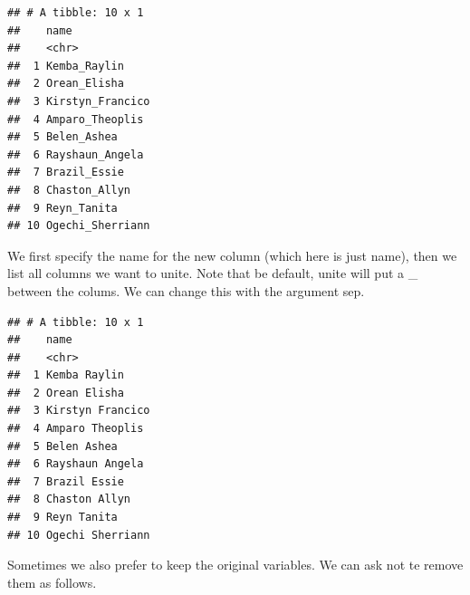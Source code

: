 \documentclass[]{tufte-book}
\newenvironment{Shaded}{}{}
\newcommand{\DataTypeTok}[1]{\textcolor[rgb]{0.56,0.13,0.00}{#1}}
\newcommand{\KeywordTok}[1]{\textcolor[rgb]{0.00,0.44,0.13}{\textbf{#1}}}
\newcommand{\NormalTok}[1]{#1}
\newcommand{\OperatorTok}[1]{\textcolor[rgb]{0.40,0.40,0.40}{#1}}
\newcommand{\StringTok}[1]{\textcolor[rgb]{0.25,0.44,0.63}{#1}}
\begin{document}
\begin{Shaded}
\end{Shaded}

\begin{verbatim}
## # A tibble: 10 x 1
##    name            
##    <chr>           
##  1 Kemba_Raylin    
##  2 Orean_Elisha    
##  3 Kirstyn_Francico
##  4 Amparo_Theoplis 
##  5 Belen_Ashea     
##  6 Rayshaun_Angela 
##  7 Brazil_Essie    
##  8 Chaston_Allyn   
##  9 Reyn_Tanita     
## 10 Ogechi_Sherriann
\end{verbatim}

We first specify the name for the new column (which here is just name), then we list all columns we want to unite. Note that be default, unite will put a \_ between the colums. We can change this with the argument sep.

\begin{Shaded}
\end{Shaded}

\begin{verbatim}
## # A tibble: 10 x 1
##    name            
##    <chr>           
##  1 Kemba Raylin    
##  2 Orean Elisha    
##  3 Kirstyn Francico
##  4 Amparo Theoplis 
##  5 Belen Ashea     
##  6 Rayshaun Angela 
##  7 Brazil Essie    
##  8 Chaston Allyn   
##  9 Reyn Tanita     
## 10 Ogechi Sherriann
\end{verbatim}

Sometimes we also prefer to keep the original variables. We can ask not te remove them as follows.

\begin{Shaded}
\end{Shaded}
\end{document}
